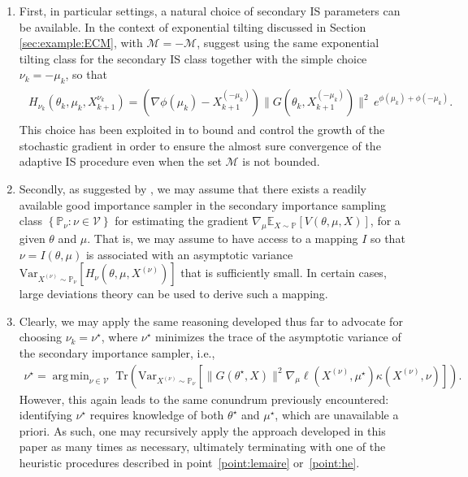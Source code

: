 \documentclass[11pt,a4paper]{article}
\theoremstyle{definition}
\DeclareMathOperator*{\argmin}{arg\,min}
\newcommand{\set}[2]{\left\{ #1 : #2 \right\}}
\newcommand{\mc}{\mathcal}
\newcommand{\mb}{\mathbb}
\begin{document}
\begin{enumerate}[label=(\roman*)]
    \item \label{point:lemaire} First, in particular settings, a natural choice of secondary IS parameters can be available. In the context of exponential tilting  discussed in Section \ref{sec:example:ECM}, with $\mc M=-\mc M$, \citet{lemaire2010unconstrained} suggest using the same exponential tilting class for the secondary IS class together with the simple choice $\nu_k=-\mu_k$, so that
    \begin{align*}
    \begin{split}
        H_{\nu_k}(\theta_k,\mu_k,X^{\nu_k}_{k+1}) = (\nabla \phi(\mu_k) - X^{(-\mu_k)}_{k+1})\|G(\theta_k, X^{(-\mu_k)}_{k+1})\|^2\, e^{\phi(\mu_k) + \phi(-\mu_k)}.
    \end{split}
    \end{align*}
    This choice has been exploited in \cite{lemaire2010unconstrained} to bound and control the growth of the stochastic gradient in order to ensure the almost sure convergence of the adaptive IS procedure even when the set $\mc M$ is not bounded.

    \item \label{point:he} Secondly, as suggested by \cite{he2023adaptive}, we may assume that there exists a readily available good importance sampler in the secondary importance sampling class $\set{\mb P_\nu}{\nu \in \mc V}$ for estimating the gradient $ \nabla_\mu \mathbb E_{X \sim \mathbb P} [V(\theta,\mu,X)]$, for a given $\theta$ and $\mu$. That is, we may assume to have access to a mapping $I$ so that $\nu = I(\theta, \mu)$ is associated with an asymptotic variance $\text{Var}_{X^{(\nu)} \sim \mathbb P_\nu}\left[H_{\nu}(\theta, \mu, X^{(\nu)})\right]$ that is sufficiently small. In certain cases, large deviations theory can be used to derive such a mapping.

    \item Clearly, we may apply the same reasoning developed thus far to advocate for choosing $\nu_k = \nu^\star$, where $\nu^\star$ minimizes the trace of the asymptotic variance of the secondary importance sampler, i.e.,
    \begin{align*}
        \nu^\star = \argmin_{\nu \in \mathcal V}\; \text{Tr}\left(\text{Var}_{X^{(\nu)} \sim \mathbb P_\nu}\left[\|G(\theta^\star,X)\|^2\nabla_\mu \ell(X^{(\nu)},\mu^\star) \kappa(X^{(\nu)},\nu)\right]\right).
    \end{align*}
    However, this again leads to the same conundrum previously encountered: identifying $\nu^\star$ requires knowledge of both $\theta^\star$ and $\mu^\star$, which are unavailable a priori. As such, one may recursively apply the approach developed in this paper as many times as necessary, ultimately terminating with one of the heuristic procedures described in point~\ref{point:lemaire} or~\ref{point:he}.
\end{enumerate}
\end{document}
